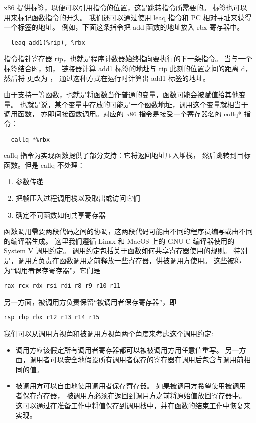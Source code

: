 x86 提供标签，以便可以引用指令的位置，这是跳转指令所需要的。
标签也可以用来标记函数指令的开头。
我们还可以通过使用 leaq 指令和 PC 相对寻址来获得一个标签的地址。
例如，下面这条指令把 add 函数的地址放入 rbx 寄存器中。
\begin{lstlisting}
  leaq add1(%rip), %rbx
\end{lstlisting}

指令指针寄存器 rip，也就是程序计数器始终指向要执行的下一条指令。
当与一个标签结合时，如，
链接器计算 add1 标签的地址与 rip 此刻的位置之间的距离 d，
然后将  更改为 ，
通过这种方式在运行时计算出 add1 标签的地址。

由于支持一等函数，也就是将函数当作普通的变量，函数可能会被赋值给其他变量。
也就是说，某个变量中存放的可能是一个函数地址，调用这个变量就相当于调用函数，
亦即间接函数调用。对应的 x86 指令是接受一个寄存器名的 callq* 指令：
\begin{lstlisting}
  callq *%rbx
\end{lstlisting}

callq 指令为实现函数提供了部分支持：它将返回地址压入堆栈，
然后跳转到目标函数。但是 callq 不处理：
\begin{enumerate}
\item 参数传递
\item 把帧压入过程调用栈以及取出或访问它们
\item 确定不同函数如何共享寄存器
\end{enumerate}

函数调用需要两段代码之间的协调，这两段代码可能由不同的程序员编写或由不同的编译器生成。
这里我们遵循 Linux 和 MacOS 上的 GNU C 编译器使用的
System V 调用约定\cite{Matz_Hubicka_Jaeger_Mitchell_2013}。
调用约定包括关于函数如何共享寄存器使用的规则。
特别是，调用方负责在函数调用之前释放一些寄存器，供被调用方使用。
这些被称为“调用者保存寄存器”，它们是
\begin{lstlisting}
rax rcx rdx rsi rdi r8 r9 r10 r11
\end{lstlisting}
另一方面，被调用方负责保留“被调用者保存寄存器”，即
\begin{lstlisting}
rsp rbp rbx r12 r13 r14 r15
\end{lstlisting}

我们可以从调用方视角和被调用方视角两个角度来考虑这个调用约定:
\begin{itemize}
\item 调用方应该假定所有调用者寄存器都可以被被调用方用任意值重写。
另一方面，调用者可以安全地假设所有调用者保存的寄存器在调用后包含与调用前相同的值。
\item 被调用方可以自由地使用调用者保存寄存器。
如果被调用方希望使用被调用者保存寄存器，
被调用方必须在返回到调用方之前将原始值放回寄存器中。
这可以通过在准备工作中将值保存到调用栈中，并在函数的结束工作中恢复来实现。
\end{itemize}

